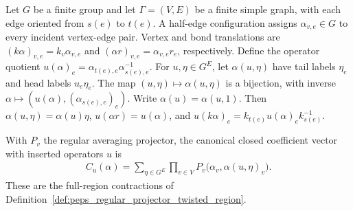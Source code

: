 \begin{definition}%
    \label{def:peps_regular_half_edge_closed}
    \leanok
    Let $G$ be a finite group and let $\Gamma=(V,E)$ be a finite
    simple graph, with each edge oriented from $s(e)$ to $t(e)$.
    A half-edge configuration assigns $\alpha_{v,e}\in G$ to
    every incident vertex-edge pair. Vertex and bond translations are
    $(k\alpha)_{v,e}=k_v\alpha_{v,e}$ and
    $(\alpha r)_{v,e}=\alpha_{v,e}r_e$, respectively.
    Define the operator quotient
    $u(\alpha)_e=\alpha_{t(e),e}\alpha_{s(e),e}^{-1}$.
    For $u,\eta\in G^E$, let $\alpha(u,\eta)$ have tail labels
    $\eta_e$ and head labels $u_e\eta_e$. The map
    $(u,\eta)\mapsto\alpha(u,\eta)$ is a bijection, with inverse
    $\alpha\mapsto(u(\alpha),(\alpha_{s(e),e})_e)$.
    Write $\alpha(u)=\alpha(u,1)$. Then
    $\alpha(u,\eta)=\alpha(u)\eta$,
    $u(\alpha r)=u(\alpha)$, and
    $u(k\alpha)_e=k_{t(e)}u(\alpha)_ek_{s(e)}^{-1}$.

    With $P_v$ the regular averaging projector, the canonical closed
    coefficient vector with inserted operators $u$ is
    \begin{align}
        C_u(\alpha)
        =\sum_{\eta\in G^E}\prod_{v\in V}
        P_v\bigl(\alpha_v,\alpha(u,\eta)_v\bigr).
        \label{eq:peps_half_edge_closed}
    \end{align}
    These are the full-region contractions of
    Definition~\ref{def:peps_regular_projector_twisted_region}.
\end{definition}

